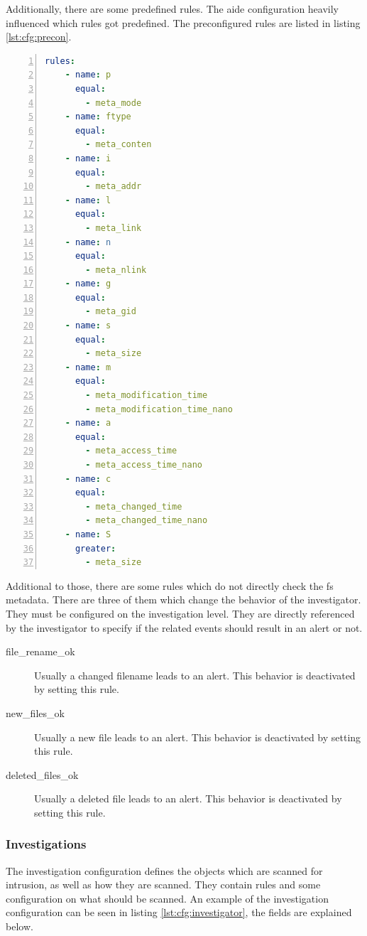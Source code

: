 Additionally, there are some predefined rules. The aide configuration heavily influenced which rules got predefined. The preconfigured rules are listed in listing \ref{lst:cfg:precon}.
\begin{lstlisting}[language=yaml, numbers=left, caption=Preconfigured Rules, label=lst:cfg:precon]
rules: 
	- name: p
	  equal:
		- meta_mode
	- name: ftype
	  equal:
		- meta_conten
	- name: i
	  equal:
		- meta_addr
	- name: l
	  equal:
		- meta_link
	- name: n
	  equal:
		- meta_nlink 
	- name: g
	  equal:
		- meta_gid
	- name: s
	  equal:
		- meta_size
	- name: m
	  equal:
		- meta_modification_time
		- meta_modification_time_nano
	- name: a
	  equal:
		- meta_access_time
		- meta_access_time_nano
	- name: c
	  equal:
		- meta_changed_time
		- meta_changed_time_nano
	- name: S
	  greater:
		- meta_size
\end{lstlisting}
	
Additional to those, there are some rules which do not directly check the \gls{fs} \gls{metadata}. There are three of them which change the behavior of the investigator. They must be configured on the investigation level. They are directly referenced by the investigator to specify if the related events should result in an alert or not. 

\begin{description}
    \item [file\_rename\_ok]    Usually a changed filename leads to an alert. This behavior is deactivated by setting this rule.
    \item [new\_files\_ok]    Usually a new file leads to an alert. This behavior is deactivated by setting this rule.
    \item [deleted\_files\_ok]    Usually a deleted file leads to an alert. This behavior is deactivated by setting this rule.
\end{description}

\subsubsection{Investigations}
\label{sec:config:investigations}

The investigation configuration defines the objects which are scanned for \gls{intrusion}, as well as how they are scanned. They contain rules and some configuration on what should be scanned. An example of the investigation configuration can be seen in listing \ref{lst:cfg:investigator}, the fields are explained below.

